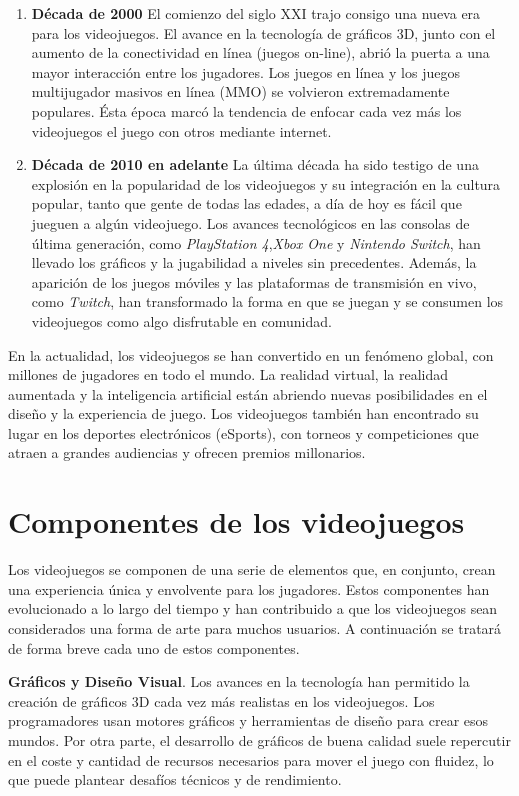 \begin{enumerate}
    \item \textbf{Década de 2000} El comienzo del siglo XXI trajo consigo una nueva era para los videojuegos. El avance en la tecnología de gráficos 3D, junto con el aumento de la conectividad en línea (juegos on-line), abrió la puerta a una mayor interacción entre los jugadores. Los juegos en línea y los juegos multijugador masivos en línea (MMO) se volvieron extremadamente populares. Ésta época marcó la tendencia de enfocar cada vez más los videojuegos el juego con otros mediante internet. 
    \item \textbf{Década de 2010 en adelante} La última década ha sido testigo de una explosión en la popularidad de los videojuegos y su integración en la cultura popular, tanto que gente de todas las edades, a día de hoy es fácil que jueguen a algún videojuego. Los avances tecnológicos en las consolas de última generación, como \textit{PlayStation 4},\textit{Xbox One} y \textit{Nintendo Switch}, han llevado los gráficos y la jugabilidad a niveles sin precedentes. Además, la aparición de los juegos móviles y las plataformas de transmisión en vivo, como \textit{Twitch}, han transformado la forma en que se juegan y se consumen los videojuegos como algo disfrutable en comunidad.
\end{enumerate}

En la actualidad, los videojuegos se han convertido en un fenómeno global, con millones de jugadores en todo el mundo. La realidad virtual, la realidad aumentada y la inteligencia artificial están abriendo nuevas posibilidades en el diseño y la experiencia de juego. Los videojuegos también han encontrado su lugar en los deportes electrónicos (eSports), con torneos y competiciones que atraen a grandes audiencias y ofrecen premios millonarios.

\section{Componentes de los videojuegos}

Los videojuegos se componen de una serie de elementos que, en conjunto, crean una experiencia única y envolvente para los jugadores. Estos componentes han evolucionado a lo largo del tiempo y han contribuido a que los videojuegos sean considerados una forma de arte para muchos usuarios. A continuación se tratará de forma breve cada uno de estos componentes.

\textbf{Gráficos y Diseño Visual}. Los avances en la tecnología han permitido la creación de gráficos 3D cada vez más realistas en los videojuegos. Los programadores usan motores gráficos y herramientas de diseño para crear esos mundos. Por otra parte, el desarrollo de gráficos de buena calidad suele repercutir en el coste y cantidad de recursos necesarios para mover el juego con fluidez, lo que puede plantear desafíos técnicos y de rendimiento.

